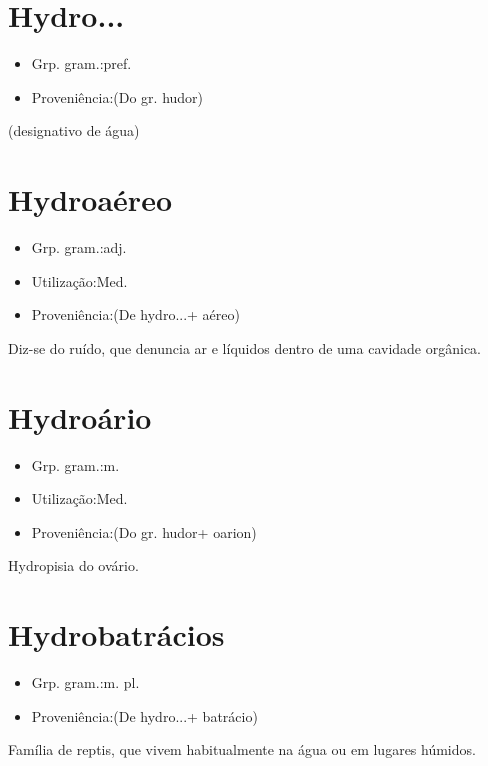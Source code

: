 \documentclass{article}
\begin{document}
\section{Hydro...}
\begin{itemize}
\item {Grp. gram.:pref.}
\end{itemize}
\begin{itemize}
\item {Proveniência:(Do gr. \textunderscore hudor\textunderscore )}
\end{itemize}
(designativo de \textunderscore água\textunderscore )
\section{Hydroaéreo}
\begin{itemize}
\item {Grp. gram.:adj.}
\end{itemize}
\begin{itemize}
\item {Utilização:Med.}
\end{itemize}
\begin{itemize}
\item {Proveniência:(De \textunderscore hydro...\textunderscore  + \textunderscore aéreo\textunderscore )}
\end{itemize}
Diz-se do ruído, que denuncia ar e líquidos dentro de uma cavidade orgânica.
\section{Hydroário}
\begin{itemize}
\item {Grp. gram.:m.}
\end{itemize}
\begin{itemize}
\item {Utilização:Med.}
\end{itemize}
\begin{itemize}
\item {Proveniência:(Do gr. \textunderscore hudor\textunderscore  + \textunderscore oarion\textunderscore )}
\end{itemize}
Hydropisia do ovário.
\section{Hydrobatrácios}
\begin{itemize}
\item {Grp. gram.:m. pl.}
\end{itemize}
\begin{itemize}
\item {Proveniência:(De \textunderscore hydro...\textunderscore  + \textunderscore batrácio\textunderscore )}
\end{itemize}
Família de reptis, que vivem habitualmente na água ou em lugares húmidos.
\end{document}
